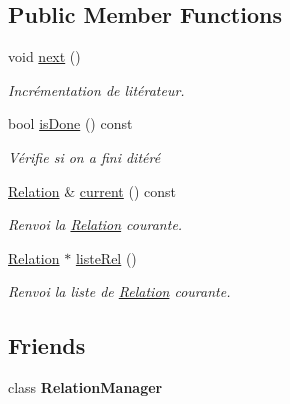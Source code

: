 \subsection*{Public Member Functions}
\begin{DoxyCompactItemize}
\item 
\mbox{\label{class_relation_manager_1_1_iterator_a4abaf2a76e6cdbc8517db8d28d1b477a}} 
void \hyperlink{class_relation_manager_1_1_iterator_a4abaf2a76e6cdbc8517db8d28d1b477a}{next} ()
\begin{DoxyCompactList}\small\item\em Incrémentation de l\textquotesingle{}itérateur. \end{DoxyCompactList}\item 
bool \hyperlink{class_relation_manager_1_1_iterator_a085af111a011f8f1592202cb53132f4c}{is\+Done} () const
\begin{DoxyCompactList}\small\item\em Vérifie si on a fini d\textquotesingle{}itéré \end{DoxyCompactList}\item 
\hyperlink{class_relation}{Relation} \& \hyperlink{class_relation_manager_1_1_iterator_a7933bc6a58564cdec8d0641b112e7856}{current} () const
\begin{DoxyCompactList}\small\item\em Renvoi la \hyperlink{class_relation}{Relation} courante. \end{DoxyCompactList}\item 
\hyperlink{class_relation}{Relation} $\ast$ \hyperlink{class_relation_manager_1_1_iterator_a63a7e7acea4f01f43b2331bc1cdd0a57}{liste\+Rel} ()
\begin{DoxyCompactList}\small\item\em Renvoi la liste de \hyperlink{class_relation}{Relation} courante. \end{DoxyCompactList}\end{DoxyCompactItemize}
\subsection*{Friends}
\begin{DoxyCompactItemize}
\item 
\mbox{\label{class_relation_manager_1_1_iterator_a55fae9c2e48742dd0a8596e6d8721775}} 
class {\bfseries Relation\+Manager}
\end{DoxyCompactItemize}


